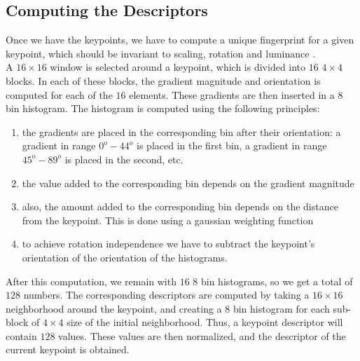 \subsection{Computing the Descriptors}
Once we have the keypoints, we have to compute a unique fingerprint for a given keypoint, which should be invariant to scaling, rotation and luminance \cite{siftImplementation}.\\
A $16\times16$ window is selected around a keypoint, which is divided into $16$ $4\times4$ blocks. In each of these blocks, the gradient magnitude and orientation is computed for each of the $16$ elements. These gradients are then inserted in a $8$ bin histogram. The histogram is computed using the following principles:
\begin{enumerate}
	\item the gradients are placed in the corresponding bin after their orientation: a gradient in range $0^o-44^o$ is placed in the first bin, a gradient in range $45^o-89^o$ is placed in the second, etc.
	\item the value added to the corresponding bin depends on the gradient magnitude
	\item also, the amount added to the corresponding bin depends on the distance from the keypoint. This is done using a gaussian weighting function
	\item to achieve rotation independence we have to subtract the keypoint's  orientation of the orientation of the histograms.
\end{enumerate}

After this computation, we remain with $16$ $8$ bin histograms, so we get a total of $128$ numbers.
The corresponding descriptors are computed by taking a $16\times16$ neighborhood around the keypoint, and creating a $8$ bin histogram for each sub-block of $4\times4$ size of the initial neighborhood. Thus, a keypoint descriptor will contain $128$ values.
These values are then normalized, and the descriptor of the current keypoint is obtained.

